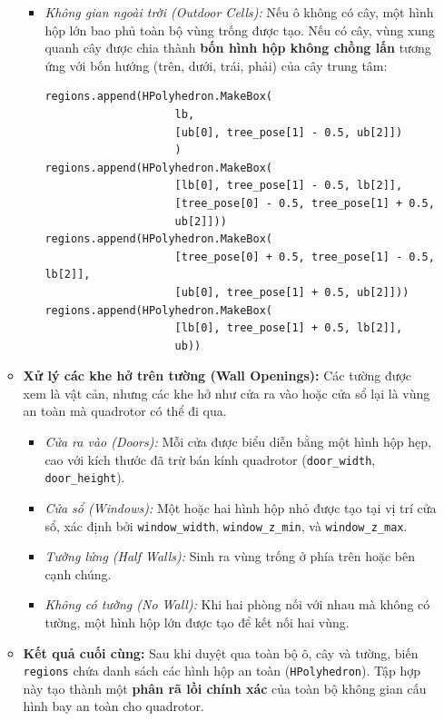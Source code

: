 \documentclass{article}
\begin{document}
\begin{itemize}
\begin{itemize}
\begin{itemize}
        \item \emph{Không gian ngoài trời (Outdoor Cells):}  
        Nếu ô không có cây, một hình hộp lớn bao phủ toàn bộ vùng trống được tạo.  
        Nếu có cây, vùng xung quanh cây được chia thành \textbf{bốn hình hộp không chồng lấn} tương ứng với bốn hướng (trên, dưới, trái, phải) của cây trung tâm:

        \begin{lstlisting}[caption={Tạo vùng an toàn xung quanh cây trong không gian ngoài trời}]
regions.append(HPolyhedron.MakeBox(
                    lb, 
                    [ub[0], tree_pose[1] - 0.5, ub[2]])
                    )
regions.append(HPolyhedron.MakeBox(
                    [lb[0], tree_pose[1] - 0.5, lb[2]],
                    [tree_pose[0] - 0.5, tree_pose[1] + 0.5,
                    ub[2]]))
regions.append(HPolyhedron.MakeBox(
                    [tree_pose[0] + 0.5, tree_pose[1] - 0.5, lb[2]],
                    [ub[0], tree_pose[1] + 0.5, ub[2]]))
regions.append(HPolyhedron.MakeBox(
                    [lb[0], tree_pose[1] + 0.5, lb[2]],
                    ub))
        \end{lstlisting}
    \end{itemize}

    \item \textbf{Xử lý các khe hở trên tường (Wall Openings):}  
    Các tường được xem là vật cản, nhưng các khe hở như cửa ra vào hoặc cửa sổ lại là vùng an toàn mà quadrotor có thể đi qua.

    \begin{itemize}
        \item \emph{Cửa ra vào (Doors):}  
        Mỗi cửa được biểu diễn bằng một hình hộp hẹp, cao với kích thước đã trừ bán kính quadrotor (\texttt{door\_width}, \texttt{door\_height}).
        \item \emph{Cửa sổ (Windows):}  
        Một hoặc hai hình hộp nhỏ được tạo tại vị trí cửa sổ, xác định bởi \texttt{window\_width}, \texttt{window\_z\_min}, và \texttt{window\_z\_max}.
        \item \emph{Tường lửng (Half Walls):}  
        Sinh ra vùng trống ở phía trên hoặc bên cạnh chúng.
        \item \emph{Không có tường (No Wall):}  
        Khi hai phòng nối với nhau mà không có tường, một hình hộp lớn được tạo để kết nối hai vùng.
    \end{itemize}

    \item \textbf{Kết quả cuối cùng:}  
    Sau khi duyệt qua toàn bộ ô, cây và tường, biến \texttt{regions} chứa danh sách các hình hộp an toàn (\texttt{HPolyhedron}). 
    Tập hợp này tạo thành một \textbf{phân rã lồi chính xác} của toàn bộ không gian cấu hình bay an toàn cho quadrotor.


\end{itemize}
\end{itemize}
\end{document}
